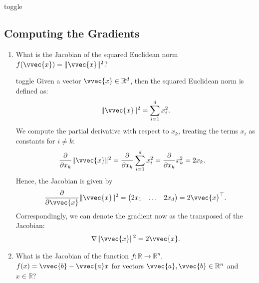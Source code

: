 \documentclass[letterpaper,10pt,english]{jupyterBook}
\begin{document}
\begin{enumerate}
\begin{sphinxuseclass}{toggle}
\begin{enumerate}
\end{enumerate}

\end{sphinxuseclass}
\end{enumerate}


\subsection{Computing the Gradients}
\label{\detokenize{optimization_exercises:computing-the-gradients}}\label{\detokenize{optimization_exercises:opt-exercises-gradients}}\begin{enumerate}
%
\item {} 
\sphinxAtStartPar
What is the Jacobian of the squared Euclidean norm \(f(\vvec{x})=\lVert\vvec{x}\rVert^2\)?

\begin{sphinxuseclass}{toggle}
\sphinxAtStartPar
Given a vector \(\vvec{x}\in\mathbb{R}^d\), then the squared Euclidean norm is defined as:
\begin{align*}
    \lVert\vvec{x}\rVert^2 = \sum_{i=1}^d x_i^2.
\end{align*}
\sphinxAtStartPar
We compute the partial derivative with respect to \(x_k\), treating the terms \(x_i\) as constants for \(i\neq k\):
\begin{align*}
    \frac{\partial}{\partial x_k} \lVert\vvec{x}\rVert^2 & = \frac{\partial}{\partial x_k} \sum_{i=1}^d x_i^2 = \frac{\partial}{\partial x_k} x_k^2  = 2x_k. 
\end{align*}
\sphinxAtStartPar
Hence, the Jacobian is given by
\begin{equation*}
\begin{split}\frac{\partial}{\partial \vvec{x}}\lVert\vvec{x}\rVert^2 = \begin{pmatrix} 2x_1&\ldots & 2x_d\end{pmatrix} = 2\vvec{x}^\top.\end{split}
\end{equation*}
Correspondingly, we can denote the gradient now as the transposed of the Jacobian:
\begin{align*}
    \nabla \lVert\vvec{x}\rVert^2 = 2\vvec{x}.
\end{align*}
\end{sphinxuseclass}
\item {} 
\sphinxAtStartPar
What is the Jacobian of the function \(f:\mathbb{R}\rightarrow \mathbb{R}^n\), \(f(x) = \vvec{b}-\vvec{a}x\) for vectors \(\vvec{a},\vvec{b}\in\mathbb{R}^n\) and \(x\in\mathbb{R}\)?


\end{enumerate}
\end{document}
